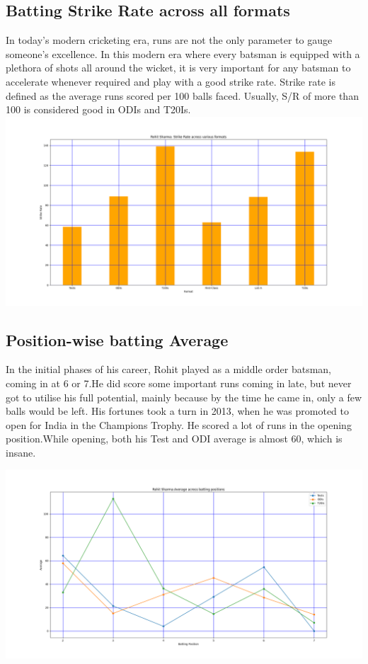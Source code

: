 \documentclass[twoside,10pt,a4paper]{article}
\numberwithin{equation}{section}
\numberwithin{figure}{section}
\begin{document}
\subsection{Batting Strike Rate across all formats}
In today's modern cricketing era, runs are not the only parameter to gauge someone's excellence. In this modern era where every batsman is equipped with a plethora of shots all around the wicket, it is very important for any batsman to accelerate whenever required and play with a good strike rate. Strike rate is defined as the average runs scored per 100 balls faced. Usually, S/R of more than 100 is considered good in ODIs and T20Is.
\includegraphics[scale=0.23]{Strike_rate.png}
\subsection{Position-wise batting Average}
In the initial phases of his career, Rohit played as a middle order batsman, coming in at 6 or 7.He did score some important runs coming in late, but never got to utilise his full potential, mainly because by the time he came in, only a few balls would be left. His fortunes took a turn in 2013, when he was promoted to open for India in the Champions Trophy. He scored a lot of runs in the opening position.While opening, both his Test and ODI average is almost 60, which is insane.
\begin{center}
\includegraphics[scale=0.24]{avg_battingpos.png}    
\end{center}
\end{document}
